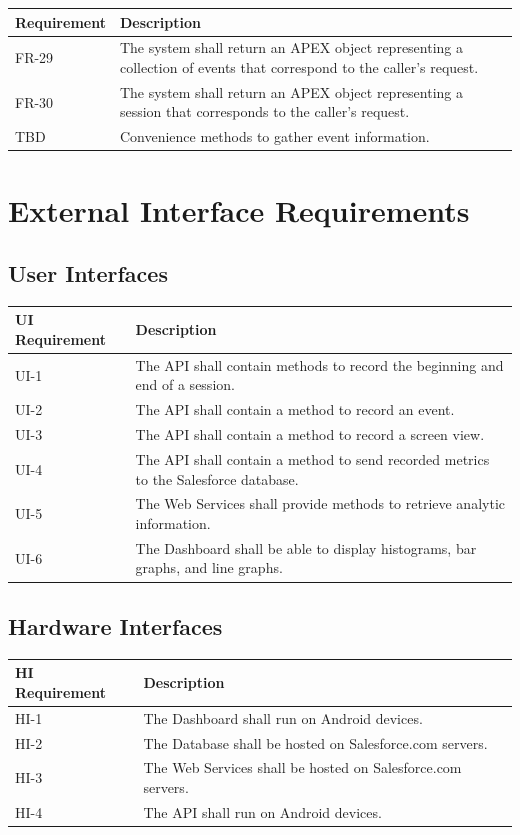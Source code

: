 \documentclass[12pt,oneside,letterpaper]{article}
\begin{document}
\begin{longtable}{|l|p{3.8in}|}
\hline
\textbf{Requirement}&\textbf{Description}\\
\hline
FR-29&The system shall return an APEX object representing a collection of events that correspond to the caller's request.\\
\hline
FR-30&The system shall return an APEX object representing a session that corresponds to the caller's request.\\
\hline
TBD&Convenience methods to gather event information.\\
\hline
\end{longtable}



\section{External Interface Requirements}
\subsection{User Interfaces}

\begin{longtable}{|l|p{3.8in}|}
\hline
\textbf{UI Requirement}&\textbf{Description}\\
\hline
UI-1&The API shall contain methods to record the beginning and end of a session.\\
\hline
UI-2&The API shall contain a method to record an event.\\
\hline
UI-3&The API shall contain a method to record a screen view.\\
\hline
UI-4&The API shall contain a method to send recorded metrics to the Salesforce database.\\
\hline
UI-5&The Web Services shall provide methods to retrieve analytic information.\\
\hline
UI-6&The Dashboard shall be able to display histograms, bar graphs, and line graphs.\\
\hline
\end{longtable}

\subsection{Hardware Interfaces}

\begin{longtable}{|l|p{3.8in}|}
\hline
\textbf{HI Requirement}&\textbf{Description}\\
\hline
HI-1&The Dashboard shall run on Android devices.\\
\hline
HI-2&The Database shall be hosted on Salesforce.com servers.\\
\hline
HI-3&The Web Services shall be hosted on Salesforce.com servers.\\
\hline
HI-4&The API shall run on Android devices.\\
\hline
\end{longtable}
\end{document}
